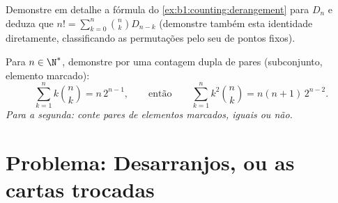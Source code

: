 \begin{exercise}[$\star\star\star$]\label{exo:b1:counting:11}
Demonstre em detalhe a fórmula do \cref{ex:b1:counting:derangement} para $D_n$ e
deduza que $n! = \sum_{k=0}^{n} \binom{n}{k} D_{n-k}$ (demonstre também
esta identidade diretamente, classificando as permutações pelo seu
 de pontos fixos).
\end{exercise}

\begin{exercise}[$\star\star\star$]\label{exo:b1:counting:12}
Para $n \in \N^*$, demonstre por uma contagem dupla de pares
(subconjunto, elemento marcado):
\[
\sum_{k=1}^{n} k \binom{n}{k} = n\, 2^{n-1},
\qquad\text{então}\qquad
\sum_{k=1}^{n} k^2 \binom{n}{k} = n(n+1)\, 2^{n-2} .
\]
\emph{Para a segunda: conte pares de elementos marcados, iguais ou não.}
\end{exercise}

\section{Problema: Desarranjos, ou as cartas trocadas}

